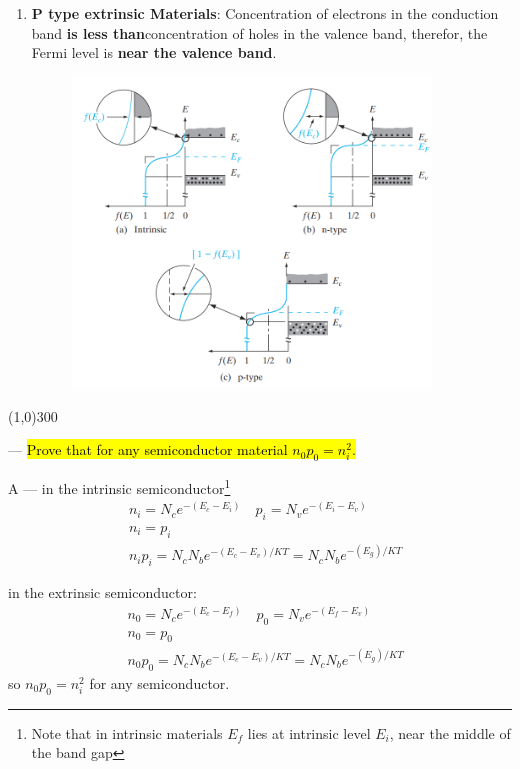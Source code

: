\documentclass[12pt,a4paper]{article}
\newcounter{question}
\newcommand\Que[1]{
   \line(1,0){300}
   \leavevmode\par
   \stepcounter{question}
   \noindent
   \fbox{\thequestion. Q} --- \hl{#1}\par}
\newcommand\Ans[2][]{%
    \leavevmode\par\noindent
   {\leftskip16pt
    A --- \textbf{#1}#2\par}}
\begin{document}
\begin{large}
{\begin{enumerate}
\item \textbf{P type extrinsic Materials}:   Concentration of electrons in the conduction band \textbf{is less than}concentration of holes in the valence band, therefor, the Fermi level is \textbf{near the valence band}.

\begin{figure}[H] 
	\centering
	\includegraphics[width = 0.9\textwidth]{fermi for materials}
	\label{fig:fermi for materials}
\end{figure}

\end{enumerate}
}

\Que{
Prove that for any semiconductor material $n_0 p_0 = n_i^2$.
}
\Ans{
in the intrinsic semiconductor\footnote{Note that in intrinsic materials $E_f$ lies at intrinsic level $E_i$, near the middle of the band gap} 
\begin{align*}
&n_i = N_c e^{-(E_c - E_i)}\quad 
p_i = N_v e^{-(E_i - E_v)}\\
&n_i = p_i\\
&n_i p_i = N_c N_b e^{-(E_c - E_v)/KT} = N_c N_b e^{-(E_g)/KT}
\end{align*}


in the extrinsic semiconductor:
\begin{align*}
&n_0 = N_c e^{-(E_c - E_f)}\quad 
p_0 = N_v e^{-(E_f - E_v)}\\
&n_0 = p_0\\
&n_0 p_0 = N_c N_b e^{-(E_c - E_v)/KT} = N_c N_b e^{-(E_g)/KT}
\end{align*}
so $\displaystyle n_0 p_0 = n_i^2 $ for any semiconductor.
}


\end{large}
\end{document}
